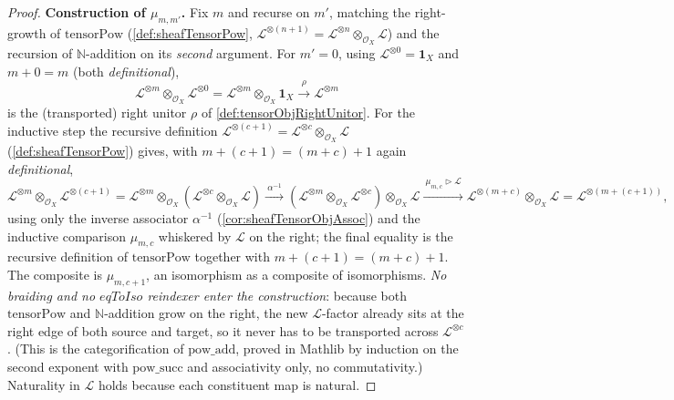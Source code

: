 \begin{proof}
  \textbf{Construction of \(\mu_{m,m'}\).} Fix \(m\) and recurse on \(m'\),
  matching the right-growth of \(\mathrm{tensorPow}\) (\cref{def:sheafTensorPow},
  \(\mathcal{L}^{\otimes(n+1)} = \mathcal{L}^{\otimes n} \otimes_{\mathcal{O}_X}
  \mathcal{L}\)) and the recursion of \(\mathbb{N}\)-addition on its \emph{second}
  argument. For \(m' = 0\), using \(\mathcal{L}^{\otimes 0} = \mathbf{1}_X\) and
  \(m + 0 = m\) (both \emph{definitional}),
  \[
    \mathcal{L}^{\otimes m} \otimes_{\mathcal{O}_X} \mathcal{L}^{\otimes 0}
      = \mathcal{L}^{\otimes m} \otimes_{\mathcal{O}_X} \mathbf{1}_X
      \xrightarrow{\ \rho\ } \mathcal{L}^{\otimes m}
  \]
  is the (transported) right unitor \(\rho\) of \cref{def:tensorObjRightUnitor}.
  For the inductive step the recursive definition \(\mathcal{L}^{\otimes (c+1)} =
  \mathcal{L}^{\otimes c} \otimes_{\mathcal{O}_X} \mathcal{L}\)
  (\cref{def:sheafTensorPow}) gives, with \(m + (c+1) = (m+c)+1\) again
  \emph{definitional},
  \[
    \mathcal{L}^{\otimes m} \otimes_{\mathcal{O}_X} \mathcal{L}^{\otimes (c+1)}
    = \mathcal{L}^{\otimes m} \otimes_{\mathcal{O}_X}
      (\mathcal{L}^{\otimes c} \otimes_{\mathcal{O}_X} \mathcal{L})
    \xrightarrow{\ \alpha^{-1}\ }
    (\mathcal{L}^{\otimes m} \otimes_{\mathcal{O}_X} \mathcal{L}^{\otimes c})
      \otimes_{\mathcal{O}_X} \mathcal{L}
    \xrightarrow{\ \mu_{m,c} \rhd \mathcal{L}\ }
    \mathcal{L}^{\otimes (m+c)} \otimes_{\mathcal{O}_X} \mathcal{L}
    = \mathcal{L}^{\otimes (m + (c+1))},
  \]
  using only the inverse associator \(\alpha^{-1}\) (\cref{cor:sheafTensorObjAssoc})
  and the inductive comparison \(\mu_{m,c}\) whiskered by \(\mathcal{L}\) on the
  right; the final equality is the recursive definition of \(\mathrm{tensorPow}\)
  together with \(m + (c+1) = (m+c)+1\). The composite is \(\mu_{m,c+1}\), an
  isomorphism as a composite of isomorphisms. \emph{No braiding and no \(eqToIso\)
  reindexer enter the construction}: because both \(\mathrm{tensorPow}\) and
  \(\mathbb{N}\)-addition grow on the right, the new \(\mathcal{L}\)-factor already
  sits at the right edge of both source and target, so it never has to be
  transported across \(\mathcal{L}^{\otimes c}\). (This is the categorification of
  \(\mathrm{pow\_add}\), proved in Mathlib by induction on the second exponent with
  \(\mathrm{pow\_succ}\) and associativity only, no commutativity.) Naturality in
  \(\mathcal{L}\) holds because each constituent map is natural.


\end{proof}
